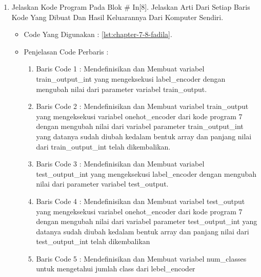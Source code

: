\begin{enumerate}
\begin{itemize}
\begin{enumerate}
\end{enumerate}
\item Hasil : \ref{chapter-7-in-7-fadila}
\par
\par
\begin{figure}[!hbtp]
\centering
\texttt{[image: figures/chapter-7-in-7-fadila.jpg]}
\caption{Code Program Pada In [7] - fadila}
\label{chapter-7-in-7-fadila}
\end{figure}
\par
\par
\end{itemize}
\par
\par
\par
\item Jelaskan Kode Program Pada Blok \# In[8]. Jelaskan Arti Dari Setiap Baris Kode Yang Dibuat Dan Hasil Keluarannya Dari Komputer Sendiri.
\begin{itemize}
\item Code Yang Digunakan : \ref{lst:chapter-7-8-fadila}.

\par
\par
\item Penjelasan Code Perbaris	: 
\begin{enumerate}
\item Baris Code 1	: Mendefinisikan dan Membuat variabel train\_output\_int yang mengeksekusi label\_encoder dengan mengubah nilai dari parameter variabel train\_output.
\item Baris Code 2	: Mendefinisikan dan Membuat variabel train\_output yang mengeksekusi variabel onehot\_encoder dari kode program 7 dengan mengubah nilai dari variabel parameter train\_output\_int yang datanya sudah diubah kedalam bentuk array dan panjang nilai dari train\_output\_int telah dikembalikan.
\item Baris Code 3	: Mendefinisikan dan Membuat variabel test\_output\_int yang mengeksekusi label\_encoder dengan mengubah nilai dari parameter variabel test\_output.
\item Baris Code 4	: Mendefinisikan dan Membuat variabel test\_output yang mengeksekusi variabel onehot\_encoder dari kode program 7 dengan mengubah nilai dari variabel parameter test\_output\_int yang datanya sudah diubah kedalam bentuk array dan panjang nilai dari test\_output\_int telah dikembalikan
\item Baris Code 5	: Mendefinisikan dan Membuat variabel num\_classes untuk mengetahui jumlah class dari lebel\_encoder

\end{enumerate}
\end{itemize}
\end{enumerate}
